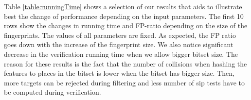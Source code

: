 \documentclass{l4proj}
\begin{document}
Table \ref{table:runningTime} shows a selection of our results that aids to illustrate best the change of performance depending on the input parameters. The first 10 rows show the changes in running time and FP-ratio depending on the size of the fingerprints. The values of all parameters are fixed. As expected, the FP ratio goes down with the increase of the fingerprint size. We also notice significant decrease in the verification running time when we allow bigger bitset size. The reason for these results is the fact that the number of collisions when hashing the features to places in the bitset is lower when the bitset has bigger size. Then, more targets can be rejected during filtering and less number of \gls{sip} tests have to be computed during verification.

\newcommand\TstrutT{\rule{0pt}{2.6ex}}         %
\newcommand\Bstrut{\rule[-1ex]{0pt}{0pt}} 
\end{document}
